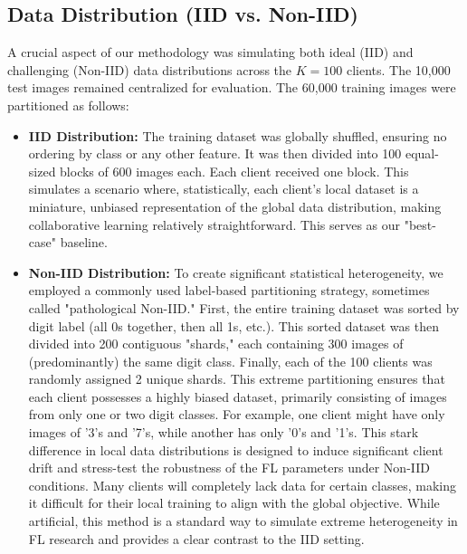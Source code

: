 \documentclass[conference]{IEEEtran}
\begin{document}
\subsection{Data Distribution (IID vs. Non-IID)}
A crucial aspect of our methodology was simulating both ideal (IID) and challenging (Non-IID) data distributions across the $K=100$ clients. The 10,000 test images remained centralized for evaluation. The 60,000 training images were partitioned as follows:
\begin{itemize}
    \item \textbf{IID Distribution:} The training dataset was globally shuffled, ensuring no ordering by class or any other feature. It was then divided into 100 equal-sized blocks of 600 images each. Each client received one block. This simulates a scenario where, statistically, each client's local dataset is a miniature, unbiased representation of the global data distribution, making collaborative learning relatively straightforward. This serves as our "best-case" baseline.
    \item \textbf{Non-IID Distribution:} To create significant statistical heterogeneity, we employed a commonly used label-based partitioning strategy, sometimes called "pathological Non-IID." First, the entire training dataset was sorted by digit label (all 0s together, then all 1s, etc.). This sorted dataset was then divided into 200 contiguous "shards," each containing 300 images of (predominantly) the same digit class. Finally, each of the 100 clients was randomly assigned 2 unique shards. This extreme partitioning ensures that each client possesses a highly biased dataset, primarily consisting of images from only one or two digit classes. For example, one client might have only images of '3's and '7's, while another has only '0's and '1's. This stark difference in local data distributions is designed to induce significant client drift and stress-test the robustness of the FL parameters under Non-IID conditions. Many clients will completely lack data for certain classes, making it difficult for their local training to align with the global objective. While artificial, this method is a standard way to simulate extreme heterogeneity in FL research and provides a clear contrast to the IID setting.
\end{itemize}
\end{document}
